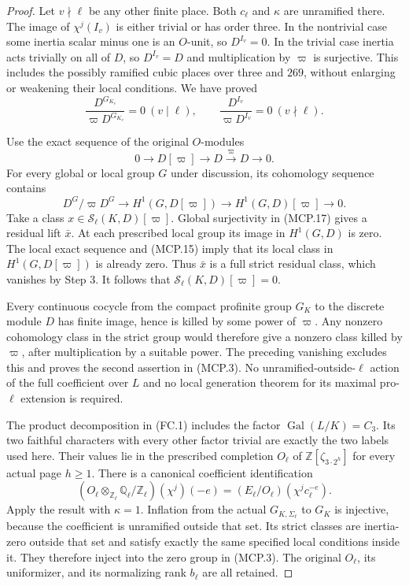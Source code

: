 \begin{proof}
Let $v\nmid\ell$ be any other finite place.  Both $c_\ell$
and $\kappa$ are unramified there.  The image of
$\chi^j(I_v)$ is either trivial or has order three.
In the nontrivial case some inertia scalar minus one is an
$O$-unit, so $D^{I_v}=0$.  In the trivial case inertia acts
trivially on all of $D$, so $D^{I_v}=D$ and multiplication by
$\varpi$ is surjective.  This includes the possibly ramified
cubic places over three and $269$, without enlarging or
weakening their local conditions.  We have proved
\[
 \frac{D^{G_{K_v}}}{\varpi D^{G_{K_v}}}=0\ (v\mid\ell),
 \qquad
 \frac{D^{I_v}}{\varpi D^{I_v}}=0\ (v\nmid\ell).
 \tag{MCP.15}
\]

Use the exact sequence of the original $O$-modules
\[
       0\longrightarrow D[\varpi]\longrightarrow D
                      \xrightarrow{\varpi}D\longrightarrow0.
 \tag{MCP.16}
\]
For every global or local group $G$ under discussion, its
cohomology sequence contains
\[
  D^G/\varpi D^G\longrightarrow H^1(G,D[\varpi])
               \longrightarrow H^1(G,D)[\varpi]\longrightarrow0.
 \tag{MCP.17}
\]
Take a class $x\in\mathcal S_\ell(K,D)[\varpi]$.
Global surjectivity in (MCP.17) gives a residual lift $\bar x$.
At each prescribed local group its image in $H^1(G,D)$ is zero.
The local exact sequence and (MCP.15) imply that its local
class in $H^1(G,D[\varpi])$ is already zero.  Thus $\bar x$
is a full strict residual class, which vanishes by Step 3.
It follows that $\mathcal S_\ell(K,D)[\varpi]=0$.

Every continuous cocycle from the compact profinite group $G_K$
to the discrete module $D$ has finite image, hence is killed
by some power of $\varpi$.  Any nonzero cohomology class in
the strict group would therefore give a nonzero class killed
by $\varpi$, after multiplication by a suitable power.
The preceding vanishing excludes this and proves the second
assertion in (MCP.3).  No unramified-outside-$\ell$ action of
the full coefficient over $L$ and no local generation theorem
for its maximal pro-$\ell$ extension is required.

The product decomposition in (FC.1) includes the factor
$\operatorname{Gal}(L/K)=C_3$.  Its two faithful characters with
every other factor trivial are exactly the two labels used here.
Their values lie in the prescribed completion $O_\ell$ of
$\mathbb Z[\zeta_{3\cdot2^h}]$ for every actual page $h\geq1$.
There is a canonical coefficient identification
\[
 (O_\ell\otimes_{\mathbb Z_\ell}\mathbb Q_\ell/\mathbb Z_\ell)
       (\chi^j)(-e)
                 =(E_\ell/O_\ell)(\chi^j c_\ell^{-e}).
 \tag{MCP.18}
\]
Apply the result with $\kappa=1$.  Inflation from the actual
$G_{K,\Sigma_\ell}$ to $G_K$ is injective, because the coefficient
is unramified outside that set.  Its strict classes are inertia-zero
outside that set and satisfy exactly the same specified local
conditions inside it.  They therefore inject into the zero group
in (MCP.3).  The original $O_\ell$, its uniformizer, and its
normalizing rank $b_\ell$ are all retained.


\end{proof}
